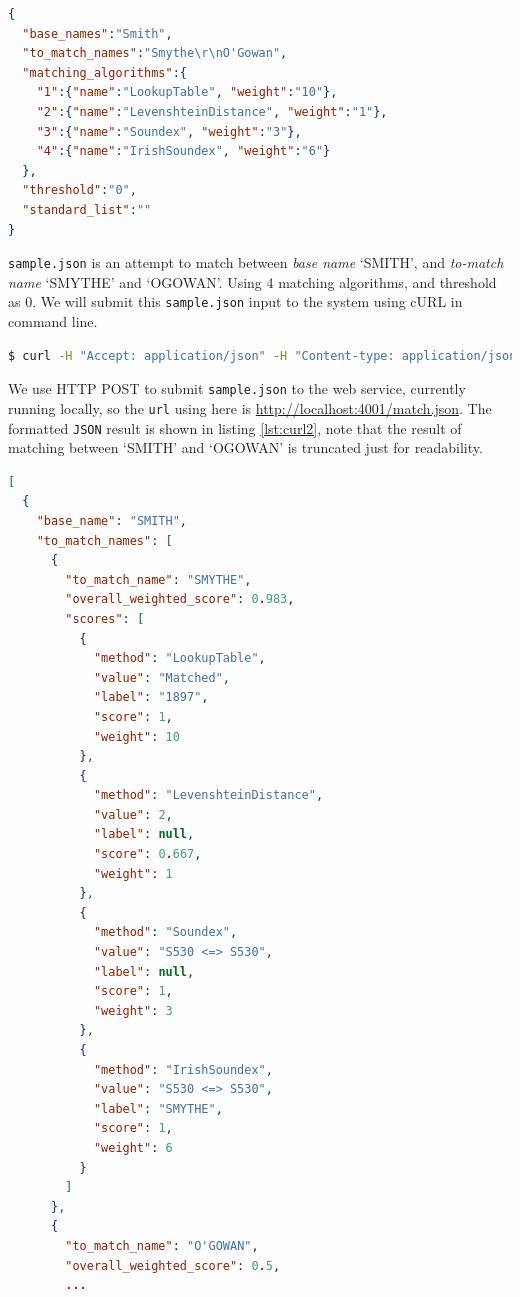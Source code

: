 \begin{minipage}{\linewidth}
\begin{lstlisting}[language={json}, label={lst:json}, caption={\texttt{sample.json}.}]
{
  "base_names":"Smith",
  "to_match_names":"Smythe\r\nO'Gowan",
  "matching_algorithms":{
    "1":{"name":"LookupTable", "weight":"10"},
    "2":{"name":"LevenshteinDistance", "weight":"1"},
    "3":{"name":"Soundex", "weight":"3"},
    "4":{"name":"IrishSoundex", "weight":"6"}
  },
  "threshold":"0",
  "standard_list":""
}
\end{lstlisting}
\end{minipage}

\texttt{sample.json} is an attempt to match between \emph{base name} `SMITH',
and \emph{to-match name} `SMYTHE' and `O\textquotesingle GOWAN'. Using 4 matching
algorithms, and threshold as 0. We will submit this \texttt{sample.json} input
to the system using cURL \cite[]{curl} in command line.

\begin{minipage}{\linewidth}
  \begin{lstlisting}[language={bash}, label={lst:curl}, caption={}]
$ curl -H "Accept: application/json" -H "Content-type: application/json" -X POST -d @sample.json http://localhost:4001/match.json
\end{lstlisting}
\end{minipage}

We use HTTP POST \cite[]{post} to submit \texttt{sample.json} to the web service,
currently running locally, so the \texttt{url} using here is \url{http://localhost:4001/match.json}.
The formatted \texttt{JSON} result is shown in listing \ref{lst:curl2},
note that the result of matching between `SMITH' and `O\textquotesingle GOWAN' is truncated
just for readability.

\begin{lstlisting}[language={json}, label={lst:curl2}, caption={Result from \texttt{sample.json}.}]
[
  {
    "base_name": "SMITH",
    "to_match_names": [
      {
        "to_match_name": "SMYTHE",
        "overall_weighted_score": 0.983,
        "scores": [
          {
            "method": "LookupTable",
            "value": "Matched",
            "label": "1897",
            "score": 1,
            "weight": 10
          },
          {
            "method": "LevenshteinDistance",
            "value": 2,
            "label": null,
            "score": 0.667,
            "weight": 1
          },
          {
            "method": "Soundex",
            "value": "S530 <=> S530",
            "label": null,
            "score": 1,
            "weight": 3
          },
          {
            "method": "IrishSoundex",
            "value": "S530 <=> S530",
            "label": "SMYTHE",
            "score": 1,
            "weight": 6
          }
        ]
      },
      {
        "to_match_name": "O'GOWAN",
        "overall_weighted_score": 0.5,
        ...
\end{lstlisting}

